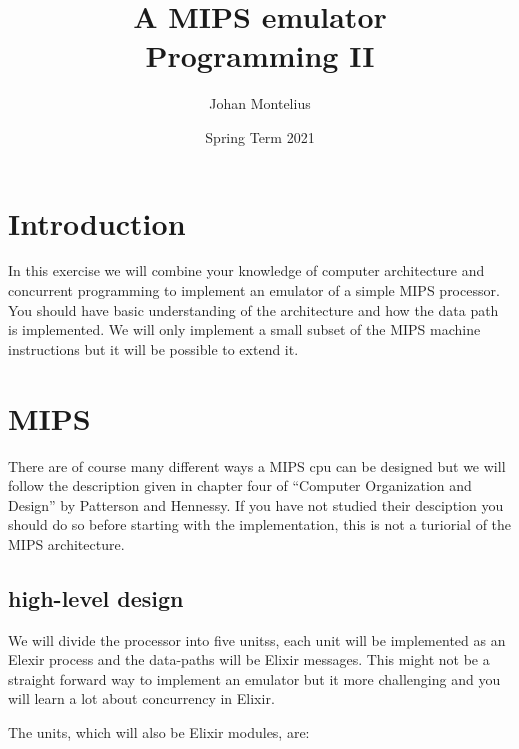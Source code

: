 \documentclass[a4paper,11pt]{article}
\begin{document}
\title{
    \textbf{A MIPS emulator}\\
    \large{Programming II}
}
\author{Johan Montelius}
\date{Spring Term 2021}
\maketitle
{}

\section*{Introduction}

In this exercise we will combine your knowledge of computer
architecture and concurrent programming to implement an emulator of a
simple MIPS processor. You should have basic understanding of the
architecture and how the data path is implemented. We will only
implement a small subset of the MIPS machine instructions but it will
be possible to extend it.

\section{MIPS}

There are of course many different ways a MIPS cpu can be designed but
we will follow the description given in chapter four of ``Computer Organization and
Design'' by Patterson and Hennessy. If you have not studied their
desciption you should do so before starting with the implementation,
this is not a turiorial of the MIPS architecture.

\subsection{high-level design}

We will divide the processor into five unitss, each unit will be
implemented as an Elexir process and the data-paths will be Elixir
messages. This might not be a straight forward way to implement an
emulator but it more challenging and you will learn a lot about concurrency in Elixir.

The units, which will also be Elixir modules, are:
\end{document}
